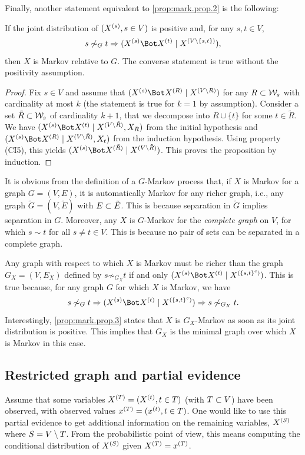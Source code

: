 Finally, another statement equivalent to 
\cref{prop:mark.prop.2} is the following:
\begin{proposition}
\label{prop:mark.prop.3}
If the joint distribution of $(\pe X s, s\in V)$ is positive and, for any $s,t\in V$,
$$
s\not \sim_G t \Ria \cind{\pe X s}{\pe X t}{\pe X {V\setm \{s,t\}}},
$$
then
$X$ is Markov relative to $G$. The converse statement is true
without the positivity assumption.
\end{proposition}
\begin{proof}
Fix $s\in V$ and assume that 
$\cind{\pe X s}{\pe X R}{\pe X {V\setm R}}$ for any $R\sub \CW_s$ with cardinality
at most $k$ (the statement is true for $k=1$ by assumption). Consider
a set $\tilde R\sub \CW_s$ of cardinality $k+1$, that we decompose into
$R\cup\{t\}$ for some $t\in\tilde R$. We have
$\cind{\pe X s}{\pe X t}{\pe X {V\setm\tilde R}, X_R}$ from the initial hypothesis
and 
$\cind{\pe X s}{\pe X R}{\pe X {V\setm\tilde R}, X_t}$ from the induction
hypothesis. Using property (CI5), this yields 
$\cind{\pe X s}{\pe X {\tilde R}}{\pe X {V\setm\tilde R}}$. This proves the
proposition by induction.
\end{proof}

\begin{remark}
It is obvious from the definition of a $G$-Markov process that, if
$X$ is Markov for a graph $G=(V, E)$, it is automatically Markov
for any richer graph, i.e., any graph $\tilde G=(V, \tilde E)$ with
$E\sub \tilde E$. This is because separation in $\tilde G$ implies
separation in $G$. Moreover, any $X$ is $G$-Markov for the {\em complete graph} on $V$, for which $s\sim
t$ for all $s\neq t\in V$. This is because no pair of sets can be
separated in a complete graph. 

Any graph with respect to which $X$ is Markov must be richer than the 
graph $G_X = (V,E_X)$ defined by $s\not\sim_{G_X} t$ if and only
$\cind{\pe X s}{\pe X t}{\pe X {\{s,t\}^c}}$. This is true because, for
any graph $G$ for which $X$ is Markov, we have 
$$
s\not\sim_{G} t\Ria \cind{\pe X s}{\pe X t}{\pe X {\{s,t\}^c}} \Ria
s\not\sim_{G_X} t.
$$
Interestingly,  \cref{prop:mark.prop.3} states that $X$ is
$G_X$-Markov as soon as its joint distribution is positive. This
implies that $G_X$ is the minimal graph over which $X$ is Markov in
this case. 
\end{remark}

\subsection{Restricted graph and partial evidence}
Assume that some variables $\pe X T = (\pe X t, t\in T)$ (with $T\sub V$) have been observed,
with observed values $\pe x T = (\pe x t, t\in T)$. One would like to use this
 partial evidence to get additional information on the
remaining variables, $\pe X S$ where $S = V \setm T$. From the
probabilistic point of view, this means computing the conditional
distribution of $\pe X S$ given $\pe X T=\pe x T$.

